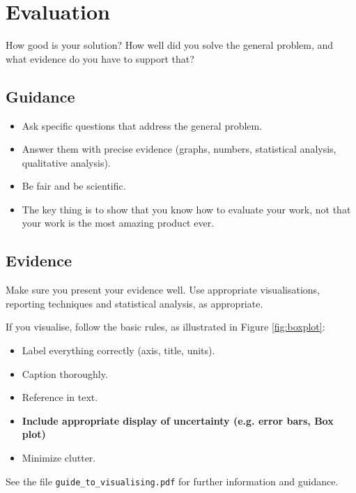 \documentclass{l4proj}
\begin{document}
\chapter{Evaluation} 
How good is your solution? How well did you solve the general problem, and what evidence do you have to support that?

\section{Guidance}
\begin{itemize}
    \item
        Ask specific questions that address the general problem.
    \item
        Answer them with precise evidence (graphs, numbers, statistical
        analysis, qualitative analysis).
    \item
        Be fair and be scientific.
    \item
        The key thing is to show that you know how to evaluate your work, not
        that your work is the most amazing product ever.
\end{itemize}

\section{Evidence}
Make sure you present your evidence well. Use appropriate visualisations, reporting techniques and statistical analysis, as appropriate.

If you visualise, follow the basic rules, as illustrated in Figure \ref{fig:boxplot}:
\begin{itemize}
\item Label everything correctly (axis, title, units).
\item Caption thoroughly.
\item Reference in text.
\item \textbf{Include appropriate display of uncertainty (e.g. error bars, Box plot)}
\item Minimize clutter.
\end{itemize}

See the file \texttt{guide\_to\_visualising.pdf} for further information and guidance.
\end{document}

